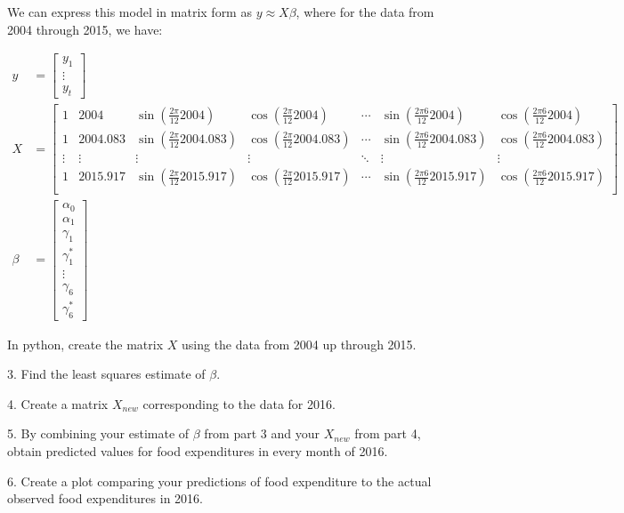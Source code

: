 \documentclass[]{article}
\begin{document}
We can express this model in matrix form as $y \approx X \beta$, where for the data from
2004 through 2015, we have:

\begin{align*}
y &= \begin{bmatrix} y_1 \\ \vdots \\ y_t \end{bmatrix} \\
X &= \begin{bmatrix}
1 & 2004 & \sin\left( \frac{2 \pi}{12} 2004 \right) & \cos\left( \frac{2 \pi}{12} 2004 \right) & \cdots & \sin\left( \frac{2 \pi 6}{12} 2004 \right) & \cos\left( \frac{2 \pi 6}{12} 2004 \right) \\
1 & 2004.083 & \sin\left( \frac{2 \pi}{12} 2004.083 \right) & \cos\left( \frac{2 \pi}{12} 2004.083 \right) & \cdots & \sin\left( \frac{2 \pi 6}{12} 2004.083 \right) & \cos\left( \frac{2 \pi 6}{12} 2004.083 \right) \\
\vdots & \vdots & \vdots & \vdots & \ddots & \vdots & \vdots \\
1 & 2015.917 & \sin\left( \frac{2 \pi}{12} 2015.917 \right) & \cos\left( \frac{2 \pi}{12} 2015.917 \right) & \cdots & \sin\left( \frac{2 \pi 6}{12} 2015.917 \right) & \cos\left( \frac{2 \pi 6}{12} 2015.917 \right) \\
\end{bmatrix} \\
\beta &= \begin{bmatrix} \alpha_0 \\ \alpha_1 \\ \gamma_1 \\ \gamma^*_1 \\ \vdots \\ \gamma_6 \\ \gamma^*_6 \end{bmatrix}
\end{align*}


In python, create the matrix $X$ using the data from 2004 up through 2015.

3. Find the least squares estimate of $\beta$.

4. Create a matrix $X_{new}$ corresponding to the data for 2016.

5. By combining your estimate of $\beta$ from part 3 and your $X_{new}$ from part 4, obtain predicted values for food expenditures in every month of 2016.

6. Create a plot comparing your predictions of food expenditure to the actual observed food expenditures in 2016.
\end{document}
